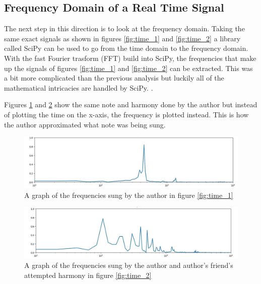 \documentclass[10pt]{article}
\begin{document}
\subsection{Frequency Domain of a Real Time Signal}
\noindent\hspace{\parindent}The next step in this direction is to look at the frequency domain. Taking the same exact signals as shown in figures \ref{fig:time_1} and \ref{fig:time_2} a library called SciPy can be used to go from the time domain to the frequency domain. With the fast Fourier trasform (FFT) build into SciPy, the frequencies that make up the signals of figures \ref{fig:time_1} and \ref{fig:time_2} can be extracted. This was a bit more complicated than the previous analysis but luckily all of the mathematical intricacies are handled by SciPy.  \cite{scipy}. 






Figures \ref{fig:frequency_1} and \ref{fig:frequency_2} show the same note and harmony done by the author but instead of plotting the time on the x-axis, the frequency is plotted instead. This is how the author approximated what note was being sung.

\begin{figure}[H]
    \centering
    \includegraphics[width=1.05\textwidth]{Alan_1_freq}
    \caption{A graph of the frequencies sung by the author in figure \ref{fig:time_1}}
    \label{fig:frequency_1}
\end{figure}

\begin{figure}[H]
    \centering
    \includegraphics[width=1.05\textwidth]{Matt_1_freq}
    \caption{A graph of the frequencies sung by the author and author's friend's attempted harmony in figure \ref{fig:time_2}}
    \label{fig:frequency_2}
\end{figure}
\end{document}
